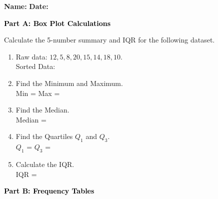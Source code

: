 \documentclass[12pt, letterpaper, fleqn]{article}
\newcommand{\blanklong}{\underline{\hspace{6.5cm}}}
\newcommand{\blankshorter}{\underline{\hspace{1.5cm}}}
\begin{document}
\textbf{Name:} \underline{\hspace{5cm}}
\hfill
\textbf{Date:} \underline{\hspace{3cm}}\\

\begin{tcolorbox}[colback=black!10]
    \large\textcolor{black}{\textbf{Part A: Box Plot Calculations}}
\end{tcolorbox}

\vspace{3mm}

\noindent
Calculate the 5-number summary and IQR for the following dataset.

\vspace{5mm}

\begin{enumerate}[itemsep=2.0cm, leftmargin=0.6cm]
\item Raw data: $12, 5, 8, 20, 15, 14, 18, 10$. \\
Sorted Data: \blanklong
\vspace{0.5cm}

\item Find the Minimum and Maximum. \\
Min = \blankshorter \quad Max = \blankshorter

\item Find the Median. \\
Median = \blankshorter

\item Find the Quartiles $Q_1$ and $Q_3$. \\
$Q_1$ = \blankshorter \quad $Q_3$ = \blankshorter

\item Calculate the IQR. \\
IQR = \blankshorter
\end{enumerate}

\newpage

\begin{tcolorbox}[colback=black!10]
    \large\textcolor{black}{\textbf{Part B: Frequency Tables}}
\end{tcolorbox}

\vspace{3mm}
\end{document}
